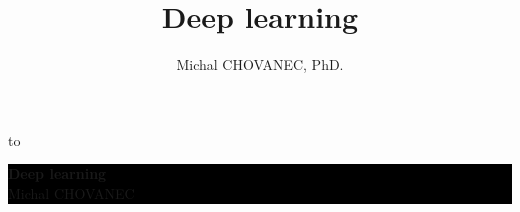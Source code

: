 \documentclass[xcolor=dvipsnames]{beamer}
\title{\color{black} \bf Deep learning}
\author{\color{black} Michal CHOVANEC, PhD.}
\date[EURP]{}
\begin{document}
{
    \usebackgroundtemplate
    {
        \vbox to 
    }
    \begin{frame}



    \centering
     \colorbox{black}
     {
        \begin{minipage}{7cm}
           {\LARGE \color{white} \bf Deep learning} \\
           {\LARGE \color{white} Michal CHOVANEC} \\
       \end{minipage}
     }


    \end{frame}
}
\end{document}

